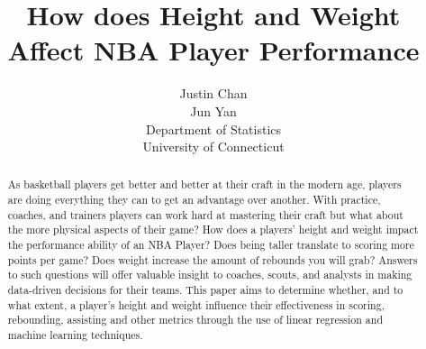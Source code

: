 \documentclass[12pt]{article}
\title{How does Height and Weight Affect NBA Player Performance}
\author{Justin Chan\\
	Jun Yan\\[2ex]
	Department of Statistics\\
	University of Connecticut\\
}
\begin{document}
\maketitle
\doublespace

\begin{abstract}

As basketball players get better and better at their craft in the modern age, players are doing everything 
they can to get an advantage over another. With practice, coaches, and trainers players can work hard at 
mastering their craft but what about the more physical aspects of their game? How does a players' height
and weight impact the performance ability of an NBA Player? Does being taller translate to scoring more
points per game? Does weight increase the amount of rebounds you will grab? Answers to such questions
will offer valuable insight to coaches, scouts, and analysts in making data-driven decisions for their teams.
This paper aims to determine whether, and to what extent, a player's height and weight influence their 
effectiveness in scoring, rebounding, assisting and other metrics through the use of linear regression and
machine learning techniques.

\end{abstract}
\end{document}
